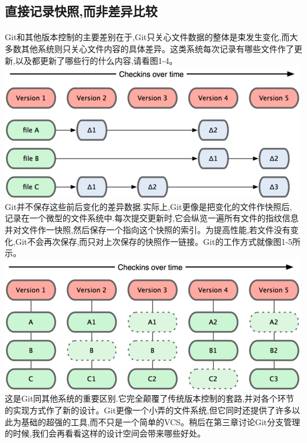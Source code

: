 \documentclass{book}
\begin{document}
	\subsection{直接记录快照,而非差异比较}
	\paragraph{}
	Git和其他版本控制的主要差别在于,Git只关心文件数据的整体是束发生变化,而大多数其他系统则只关心文件内容的具体差异。这类系统每次记录有哪些文件作了更新,以及都更新了哪些行的什么内容,请看图1-4。\\
	\includegraphics{1-4.png}\\
	Git并不保存这些前后变化的差异数据.实际上,Git更像是把变化的文件作快照后, 记录在一个微型的文件系统中.每次提交更新时,它会纵览一遍所有文件的指纹信息并对文件作一快照,然后保存一个指向这个快照的索引。为提高性能,若文件没有变化,Git不会再次保存,而只对上次保存的快照作一链接。Git的工作方式就像图1-5所示。\\
	\includegraphics{1-5.png}\\
	这是Git同其他系统的重要区别.它完全颠覆了传统版本控制的套路,并对各个环节的实现方式作了新的设计。Git更像一个小弄的文件系统,但它同时还提供了许多以此为基础的超强的工具,而不只是一个简单的VCS。稍后在第三章讨论Git分支管理的时候,我们会再看看这样的设计空间会带来哪些好处。\\
\end{document}
